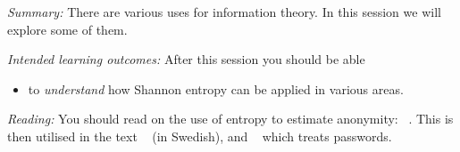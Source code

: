 \emph{Summary:}
There are various uses for information theory.
In this session we will explore some of them.

\emph{Intended learning outcomes:}
After this session you should be able
\begin{itemize}
  \item to \emph{understand} how Shannon entropy can be applied in various 
    areas.
\end{itemize}

\emph{Reading:}
You should read on the use of entropy to estimate anonymity:
~\cite{Eckersley2010hui}.
This is then utilised in the text ~\cite{Bosk2013gl} (in 
Swedish), and ~\cite{Komanduri2011opa} which treats 
passwords.
